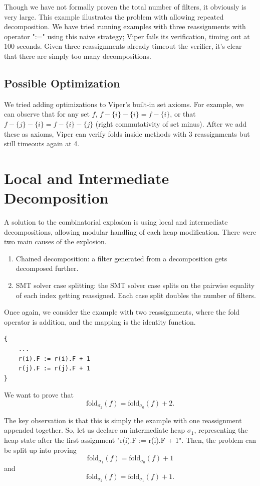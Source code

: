 \documentclass[msc,oneside]{ubcthesis}
\theoremstyle{definition}
\begin{document}
Though we have not formally proven the total number of filters, it obviously is very large. This example illustrates the problem with allowing repeated decomposition. We have tried running examples with three reassignments with operator ":=" using this naive strategy; Viper fails its verification, timing out at 100 seconds. Given three reassignments already timeout the verifier, it's clear that there are simply too many decompositions.

\subsection{Possible Optimization}
We tried adding optimizations to Viper's built-in set axioms. For example, we can observe that for any set $f$, $f - \{i\} - \{i\} = f - \{i\}$, or that $f - \{j\} - \{i\} = f - \{i\} - \{j\}$ (right commutativity of set minus). After we add these as axioms, Viper can verify folds inside methods with 3 reassignments but still timeouts again at 4.

\section{Local and Intermediate Decomposition}
A solution to the combinatorial explosion is using local and intermediate decompositions, allowing modular handling of each heap modification. There were two main causes of the explosion.
\begin{enumerate}
    \item Chained decomposition: a filter generated from a decomposition gets decomposed further.
    \item SMT solver case splitting: the SMT solver case splits on the pairwise equality of each index getting reassigned. Each case split doubles the number of filters.
\end{enumerate}

Once again, we consider the example with two reassignments, where the fold operator is addition, and the mapping is the identity function. 
\begin{lstlisting}
{
    ...
    r(i).F := r(i).F + 1 
    r(j).F := r(j).F + 1 
}
\end{lstlisting}
We want to prove that $$\textrm{fold}_{\sigma_2}(f) = \textrm{fold}_{\sigma_0}(f) + 2.$$

The key observation is that this is simply the example with one reassignment appended together. So, let us declare an intermediate heap $\sigma_1$, representing the heap state after the first assignment "r(i).F := r(i).F + 1". Then, the problem can be split up into proving 
$$\textrm{fold}_{\sigma_1}(f) = \textrm{fold}_{\sigma_0}(f) + 1 $$ and $$\textrm{fold}_{\sigma_2}(f) = \textrm{fold}_{\sigma_1}(f) + 1. $$ 
\end{document}
